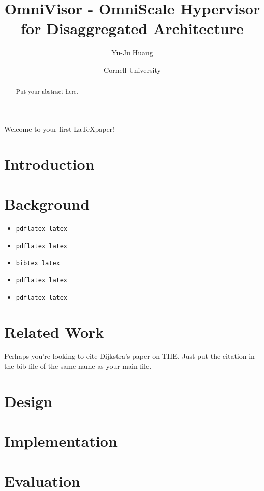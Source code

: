 \documentclass[twocolumn]{article}
\title{OmniVisor - OmniScale Hypervisor for Disaggregated Architecture}
\author{Yu-Ju Huang}
\date{Cornell University}
\begin{document}
\maketitle

\begin{abstract}
Put your abstract here.
\end{abstract}

Welcome to your first \LaTeX paper!

\section{Introduction}


\section{Background}

\begin{itemize}
\item \texttt{pdflatex latex}
\item \texttt{pdflatex latex}
\item \texttt{bibtex latex}
\item \texttt{pdflatex latex}
\item \texttt{pdflatex latex}
\end{itemize}

\section{Related Work}

Perhaps you're looking to cite Dijkstra's paper on
THE\cite{DBLP:journals/cacm/Dijkstra68}.  Just put the citation in the bib file of the same name as your main file.

\section{Design}
\section{Implementation}
\section{Evaluation}

{}

\end{document}
